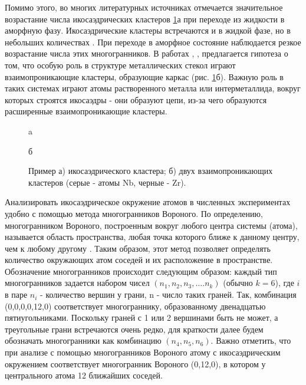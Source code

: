 \thispagestyle{plain}
Помимо этого, во многих литературных источниках отмечается значительное возрастание числа икосаэдрических кластеров \ref{icosahedra_lit}а при переходе из жидкости в аморфную фазу. Икосаэдрические кластеры встречаются и в жидкой фазе, но в небольших количествах \cite{Reddy}. При переходе в аморфное состояние наблюдается резкое возрастание числа этих многогранников. В работах \cite{Sheng}, \cite{Levchenko}, \cite{Pryadilschikov} предлагается гипотеза о том, что особую роль в структуре металлических стекол играют взаимопроникающие кластеры, образующие каркас (рис. \ref{icosahedra_lit}б). Важную роль в таких системах играют атомы растворенного металла или интерметаллида, вокруг которых строятся икосаэдры - они образуют цепи, из-за чего образуются расширенные  взаимопроникающие кластеры.
\begin{figure}[h]
	\begin{minipage}[h]{0.5\linewidth}
		 a \\
	\end{minipage}
	\hfill
	\begin{minipage}[h]{0.5\linewidth}
		 б\\
	\end{minipage}
	\caption{ Пример а)  икосаэдрического кластера; б) двух взаимопроникающих кластеров (серые - атомы Nb, черные - Zr).}
	\label{icosahedra_lit}
\end{figure}
Анализировать икосаэдрическое окружение атомов в численных экспериментах удобно с помощью метода многогранников Вороного. По определению, многогранником Вороного, построенным вокруг любого центра системы (атома), называется область пространства, любая точка которого ближе к данному центру, чем к любому другому \cite{Medvedev}. Таким образом, этот метод позволяет определять количество окружающих атом соседей и их расположение в пространстве.  Обозначение многогранников происходит следующим образом: каждый тип многогранников задается набором чисел $(n_1,n_2,n_3,….n_k)$ (обычно $k=6$), где $i$ в паре  $n_{i}$ - количество вершин у грани, n - число таких граней. Так, комбинация (0,0,0,0,12,0) соответствует многограннику, образованному двенадцатью пятиугольниками. Поскольку граней с 1 или 2 вершинами быть не может, а треугольные грани встречаются очень редко, для краткости далее будем обозначать многогранники как комбинацию $(n_4,n_5,n_6)$. Важно отметить, что при анализе с помощью многогранников Вороного атому с икосаэдрическим окружением соответствует многогранник Вороного (0,12,0), в котором у центрального атома 12 ближайших соседей.
